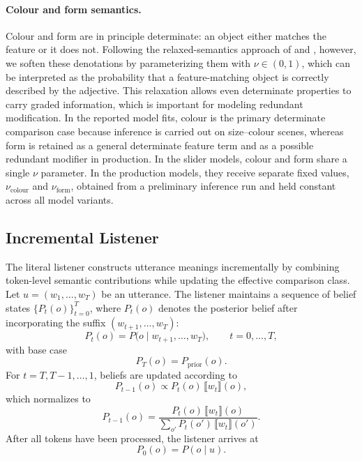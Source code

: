 \documentclass[man,floatsintext]{apa7}
\begin{document}
\paragraph{Colour and form semantics.}
Colour and form are in principle determinate: an object either matches the feature or it does not.
Following the relaxed-semantics approach of \citet{degen2020redundancy} and \citet{waldon2021modeling}, however, we soften these denotations by parameterizing them with $\nu \in (0,1)$, which can be interpreted as the probability that a feature-matching object is correctly described by the adjective.
This relaxation allows even determinate properties to carry graded information, which is important for modeling redundant modification.
In the reported model fits, colour is the primary determinate comparison case because inference is carried out on size--colour scenes, whereas form is retained as a general determinate feature term and as a possible redundant modifier in production.
In the slider models, colour and form share a single $\nu$ parameter.
In the production models, they receive separate fixed values, $\nu_\text{colour}$ and $\nu_\text{form}$, obtained from a preliminary inference run and held constant across all model variants.

\subsection{Incremental Listener}
\label{sec:model:composition}

The literal listener constructs utterance meanings incrementally by combining token-level semantic contributions while updating the effective comparison class.
Let $u = (w_1, \ldots, w_T)$ be an utterance.
The listener maintains a sequence of belief states $\{P_t(o)\}_{t=0}^{T}$, where $P_t(o)$ denotes the posterior belief after incorporating the suffix $(w_{t+1}, \ldots, w_T)$:
\begin{equation}
  P_t(o) = P\bigl(o \mid w_{t+1}, \ldots, w_T\bigr), \qquad t = 0, \ldots, T,
  \label{eq:listener_belief}
\end{equation}
with base case
\begin{equation}
  P_T(o) = P_{\mathrm{prior}}(o).
  \label{eq:listener_base}
\end{equation}
For $t = T, T-1, \ldots, 1$, beliefs are updated according to
\begin{equation}
  P_{t-1}(o) \propto P_t(o)\,\llbracket w_t \rrbracket(o),
  \label{eq:comp}
\end{equation}
which normalizes to
\begin{equation}
  P_{t-1}(o) = \frac{P_t(o)\,\llbracket w_t \rrbracket(o)}{\sum_{o'} P_t(o')\,\llbracket w_t \rrbracket(o')}.
  \label{eq:comp_norm}
\end{equation}
After all tokens have been processed, the listener arrives at
\begin{equation}
  P_0(o) = P(o \mid u).
  \label{eq:listener_final}
\end{equation}
\end{document}

